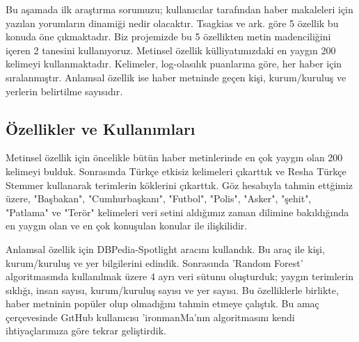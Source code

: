 \documentclass[conference]{IEEEtran}
\begin{document}
Bu a\c{s}amada ilk ara\c{s}t{\i}rma sorumuzu; kullan{\i}c{\i}lar taraf{\i}ndan haber makaleleri i\c{c}in yaz{\i}lan yorumlar{\i}n dinami\u{g}i nedir olacakt{\i}r. Tsagkias ve ark. \cite{tsagkias_predicting_2009} göre 5 özellik bu konuda öne \c{c}{\i}kmaktad{\i}r. Biz projemizde bu 5 özellikten metin madencili\u{g}ini i\c{c}eren 2 tanesini kullan{\i}yoruz. Metinsel özellik külliyat{\i}m{\i}zdaki en yayg{\i}n 200 kelimeyi kullanmaktad{\i}r. Kelimeler, log-olas{\i}l{\i}k puanlar{\i}na göre, her haber i\c{c}in s{\i}ralanm{\i}\c{s}t{\i}r. Anlamsal özellik ise haber metninde ge\c{c}en ki\c{s}i, kurum/kurulu\c{s} ve yerlerin belirtilme say{\i}s{\i}d{\i}r.

\subsection{Özellikler ve Kullan{\i}mlar{\i}}
Metinsel özellik i\c{c}in öncelikle bütün haber metinlerinde en \c{c}ok yayg{\i}n olan 200 kelimeyi bulduk. Sonras{\i}nda Türk\c{c}e etkisiz kelimeleri \c{c}{\i}kartt{\i}k ve Resha Türk\c{c}e Stemmer \cite{resha-turkish-stemmer} kullanarak terimlerin köklerini \c{c}{\i}kartt{\i}k. Göz hesab{\i}yla tahmin ett\u{g}imiz üzere, "Ba\c{s}bakan", "Cumhurba\c{s}kan{\i}", "Futbol", "Polis", "Asker", "\c{s}ehit", "Patlama" ve "Terör" kelimeleri veri setini ald{\i}\u{g}{\i}m{\i}z zaman dilimine bak{\i}ld{\i}\u{g}{\i}nda en yayg{\i}n olan ve en \c{c}ok konu\c{s}ulan konular ile ili\c{s}kilidir.

Anlamsal özellik i\c{c}in DBPedia-Spotlight \cite{isem2013daiber} arac{\i}n{\i} kulland{\i}k. Bu ara\c{c} ile ki\c{s}i, kurum/kurulu\c{s} ve yer bilgilerini edindik. Sonras{\i}nda 'Random Forest' \cite{random-forest} algoritmas{\i}nda kullan{\i}lmak üzere 4 ayr{\i} veri sütunu olu\c{s}turduk; yayg{\i}n terimlerin s{\i}kl{\i}\u{g}{\i}, insan say{\i}s{\i}, kurum/kurulu\c{s} say{\i}s{\i} ve yer say{\i}s{\i}. Bu özelliklerle birlikte, haber metninin popüler olup olmad{\i}\u{g}{\i}n{\i} tahmin etmeye \c{c}al{\i}\c{s}t{\i}k. Bu ama\c{c} \c{c}er\c{c}evesinde G{\i}tHub kullan{\i}c{\i}s{\i} 'ironmanMa'n{\i}n algoritmas{\i}n{\i} kendi ihtiya\c{c}lar{\i}m{\i}za göre tekrar geli\c{s}tirdik.
\end{document}
